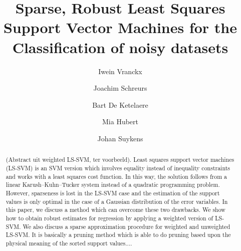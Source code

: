 \documentclass[preprint,12pt]{elsarticle}
\begin{document}
\begin{frontmatter}


\title{Sparse, Robust Least Squares Support Vector Machines for the Classification of noisy datasets}





\author[statistics]{Iwein Vranckx}

\author[stadius]{Joachim Schreurs}
\author[mebios]{Bart De Ketelaere}
\author[statistics]{Mia Hubert}
\author[stadius]{Johan Suykens}
%
\address[statistics]{KU Leuven, Department of Mathematics and LStat, Celestijnenlaan 200B, BE-3001 Heverlee, Belgium}
\address[stadius]{KU Leuven, ESAT-STADIUS, Kasteelpark Arenberg 10, BE-3001 Heverlee, Belgium}
\address[mebios]{KU Leuven, Division of Mechatronics, Biostatistics and Sensors, Kasteelpark Arenberg 30, BE-3001 Heverlee, Belgium}

\begin{abstract}
(Abstract uit weighted LS-SVM, ter voorbeeld). Least squares support vector machines (LS-SVM) is an SVM version which involves
equality instead of inequality constraints and works with a least squares cost function.
In this way, the solution follows from a linear Karush–Kuhn–Tucker system instead of
a quadratic programming problem. However, sparseness is lost in the LS-SVM case and
the estimation of the support values is only optimal in the case of a Gaussian distribution
of the error variables. In this paper, we discuss a method which can overcome these two
drawbacks. We show how to obtain robust estimates for regression by applying a weighted
version of LS-SVM. We also discuss a sparse approximation procedure for weighted and
unweighted LS-SVM. It is basically a pruning method which is able to do pruning based
upon the physical meaning of the sorted support values....


\end{abstract}
\end{frontmatter}
\end{document}
